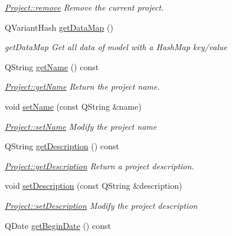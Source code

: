 \begin{DoxyCompactItemize}
\begin{DoxyCompactList}\small\item\em \hyperlink{classModels_1_1Project_ab55c71c009ae796e7dbe03017fed67ee}{Project\-::remove} Remove the current project. \end{DoxyCompactList}\item 
Q\-Variant\-Hash \hyperlink{classModels_1_1Project_a7db5156657a7dbadd024aead14a40182}{get\-Data\-Map} ()
\begin{DoxyCompactList}\small\item\em get\-Data\-Map Get all data of model with a Hash\-Map key/value \end{DoxyCompactList}\item 
Q\-String \hyperlink{classModels_1_1Project_a11d3b85bdc38daba928bfbfd962a0e32}{get\-Name} () const 
\begin{DoxyCompactList}\small\item\em \hyperlink{classModels_1_1Project_a11d3b85bdc38daba928bfbfd962a0e32}{Project\-::get\-Name} Return the project name. \end{DoxyCompactList}\item 
void \hyperlink{classModels_1_1Project_ac5ffa6ff6d31647fd880881257f47889}{set\-Name} (const Q\-String \&name)
\begin{DoxyCompactList}\small\item\em \hyperlink{classModels_1_1Project_ac5ffa6ff6d31647fd880881257f47889}{Project\-::set\-Name} Modify the project {\itshape name} \end{DoxyCompactList}\item 
Q\-String \hyperlink{classModels_1_1Project_a065b9cd68962c78302a84c686e10ae13}{get\-Description} () const 
\begin{DoxyCompactList}\small\item\em \hyperlink{classModels_1_1Project_a065b9cd68962c78302a84c686e10ae13}{Project\-::get\-Description} Return a project description. \end{DoxyCompactList}\item 
void \hyperlink{classModels_1_1Project_a2cccaca77bff95f13b3320f3f03dc9e7}{set\-Description} (const Q\-String \&description)
\begin{DoxyCompactList}\small\item\em \hyperlink{classModels_1_1Project_a2cccaca77bff95f13b3320f3f03dc9e7}{Project\-::set\-Description} Modify the project {\itshape description} \end{DoxyCompactList}\item 
Q\-Date \hyperlink{classModels_1_1Project_a31b8e46aabb1327499f7e36f170900e3}{get\-Begin\-Date} () const 

\end{DoxyCompactItemize}
